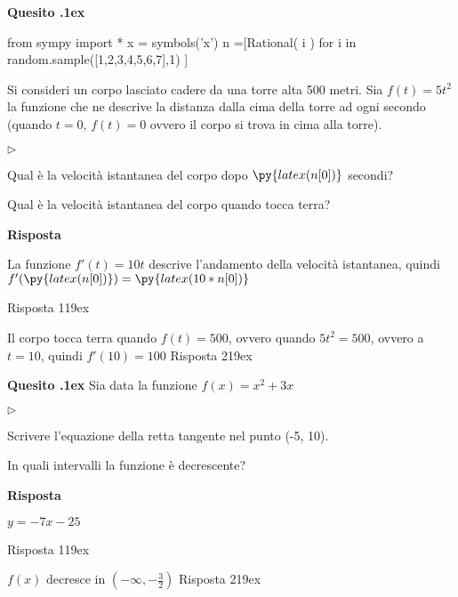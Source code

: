 \documentclass[11pt,twoside,a4paper]{article}
\newcommand{\mylabel}[1]{#1\hfill}
\renewenvironment{itemize}
  {\begin{list}{$\triangleright$}{%
   \setlength{\parskip}{0mm}
   \setlength{\topsep}{.4\baselineskip}
   \setlength{\rightmargin}{0mm}
   \setlength{\listparindent}{0mm}
   \setlength{\itemindent}{0mm}
   \setlength{\labelwidth}{2ex}
   \setlength{\itemsep}{.4\baselineskip}
   \setlength{\parsep}{0mm}
   \setlength{\partopsep}{0mm}
   \setlength{\labelsep}{1ex}
   \setlength{\leftmargin}{\labelwidth+\labelsep}
   \let\makelabel\mylabel}}{%
   \end{list}\vspace*{-1.3mm}}
\newcounter{quesito}
\newenvironment{question}{\bigskip\addtocounter{quesito}{1}\bigskip\bigskip\par\textbf{Quesito \thequesito.\kern1ex}}{\vspace{\parskip}}
\newenvironment{answer}{\par\textbf{Risposta\quad}}{\vspace{\parskip}}
\begin{document}
\begin{question}
\begin{pycode}
from sympy import *
x = symbols('x')
n =[Rational( i ) for i in random.sample([1,2,3,4,5,6,7],1) ]
\end{pycode}
Si consideri un corpo lasciato cadere da una torre alta 500 metri. Sia  $f(t) = 5 t^2$ la funzione che ne descrive la distanza dalla cima della torre ad ogni secondo (quando $t=0$, $f(t) = 0$ ovvero il corpo si trova in cima alla torre).
\begin{itemize}
\item[1.] Qual è la velocità istantanea del corpo dopo $\py{latex(n[0])}$ secondi?
\item[2.] Qual è la velocità istantanea del corpo quando tocca terra?
\end{itemize}
\begin{answer}

La funzione $f'(t) = 10 t$ descrive l'andamento della velocità istantanea, quindi
{\color{blue}
$f'(\py{latex(n[0])}) = \py{latex(10*n[0])}$ }

{\color{blue}
\hfill Risposta 1\kern19ex}

Il corpo tocca terra quando $f(t) = 500$, ovvero quando $5t^2 = 500$, ovvero a $t = 10$, quindi
{\color{blue}
$f'(10) = 100$
\hfill Risposta 2\kern19ex}

\end{answer}
\end{question}
\begin{question}
Sia data la funzione $f(x) = x^2 + 3 x$
\begin{itemize}
\item[1.] Scrivere l'equazione della retta tangente nel punto (-5, 10).
\item[2.] In quali intervalli la funzione è decrescente?
\end{itemize}
\begin{answer}

{\color{blue}
$y = -7x -25$ }

{\color{blue}
\hfill Risposta 1\kern19ex}

{\color{blue}
$f(x)$ decresce in $(-\infty, -\frac{3}{2})$
\hfill Risposta 2\kern19ex}

\end{answer}
\end{question}
\end{document}
